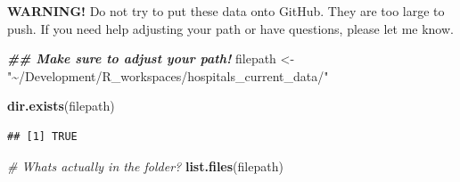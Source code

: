 \documentclass[
]{article}
\newenvironment{Shaded}{\begin{snugshade}}{\end{snugshade}}
\newcommand{\CommentTok}[1]{\textcolor[rgb]{0.56,0.35,0.01}{\textit{#1}}}
\newcommand{\DocumentationTok}[1]{\textcolor[rgb]{0.56,0.35,0.01}{\textbf{\textit{#1}}}}
\newcommand{\FunctionTok}[1]{\textcolor[rgb]{0.13,0.29,0.53}{\textbf{#1}}}
\newcommand{\NormalTok}[1]{#1}
\newcommand{\OtherTok}[1]{\textcolor[rgb]{0.56,0.35,0.01}{#1}}
\newcommand{\StringTok}[1]{\textcolor[rgb]{0.31,0.60,0.02}{#1}}
\begin{document}
\textbf{WARNING!} Do not try to put these data onto GitHub. They are too
large to push. If you need help adjusting your path or have questions,
please let me know.

\begin{Shaded}
\begin{Highlighting}[]
\DocumentationTok{\#\# Make sure to adjust your path!}
\NormalTok{filepath }\OtherTok{\textless{}{-}} \StringTok{"\textasciitilde{}/Development/R\_workspaces/hospitals\_current\_data/"}

\FunctionTok{dir.exists}\NormalTok{(filepath)}
\end{Highlighting}
\end{Shaded}

\begin{verbatim}
## [1] TRUE
\end{verbatim}

\begin{Shaded}
\begin{Highlighting}[]
\CommentTok{\# What\textquotesingle{}s actually in the folder?}
\FunctionTok{list.files}\NormalTok{(filepath)}
\end{Highlighting}
\end{Shaded}
\end{document}
